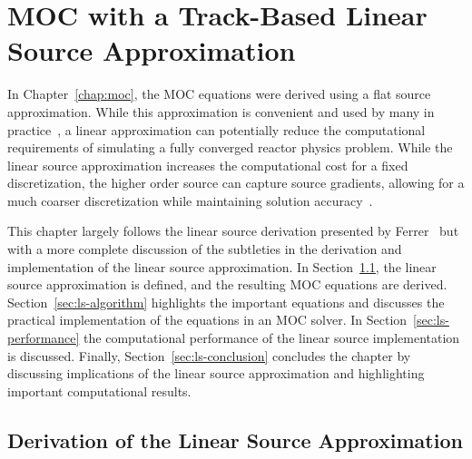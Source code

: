 \chapter{MOC with a Track-Based Linear Source Approximation}
\label{chap:linear-source}

In Chapter~\ref{chap:moc}, the MOC equations were derived using a flat source approximation. While this approximation is convenient and used by many in practice~\cite{dragon_3d_moc, kochunas, apollo3_vv, cactus_3d, liu_mrt, mockingbird}, a linear approximation can potentially reduce the computational requirements of simulating a fully converged reactor physics problem. While the linear source approximation increases the computational cost for a fixed discretization, the higher order source can capture source gradients, allowing for a much coarser discretization while maintaining solution accuracy~\cite{ferrer2012linear}. 

This chapter largely follows the linear source derivation presented by Ferrer~\cite{ferrer2015linear} but with a more complete discussion of the subtleties in the derivation and implementation of the linear source approximation. In Section~\ref{sec:ls-derivation}, the linear source approximation is defined, and the resulting \ac{MOC} equations are derived. Section~\ref{sec:ls-algorithm} highlights the important equations and discusses the practical implementation of the equations in an \ac{MOC} solver. In Section~\ref{sec:ls-performance} the computational performance of the linear source implementation is discussed. Finally, Section~\ref{sec:ls-conclusion} concludes the chapter by discussing implications of the linear source approximation and highlighting important computational results.

\section{Derivation of the Linear Source Approximation}
\label{sec:ls-derivation}

